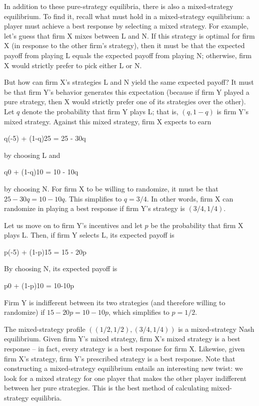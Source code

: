 In addition to these pure-strategy equilibria, there is also a mixed-strategy equilibrium. To find it, recall what must hold in a mixed-strategy equilibrium: a player must achieve a best response by selecting a mixed strategy. For example, let’s guess that firm X mixes between L and N. If this strategy is optimal for firm X (in response to the other firm’s strategy), then it must be that the expected payoff from playing L equals the expected payoff from playing N; otherwise, firm X would strictly prefer to pick either L or N.

But how can firm X’s strategies L and N yield the same expected payoff? It must be that firm Y’s behavior generates this expectation (because if firm Y played a pure strategy, then X would strictly prefer one of its strategies over the other). Let $q$ denote the probability that firm Y plays L; that is, $(q, 1 - q)$ is firm Y’s mixed strategy. Against this mixed strategy, firm X expects to earn

\bee
q(-5) + (1-q)25 = 25 - 30q
\eee

by choosing L and

\bee
q0 + (1-q)10 = 10 - 10q
\eee

by choosing N. For firm X to be willing to randomize, it must be that $25 - 30q = 10 - 10q$. This simplifies to $q = 3/4$. In other words, firm X can randomize in playing a best response if firm Y’s strategy is $(3/4, 1/4)$.

Let us move on to firm Y’s incentives and let $p$ be the probability that firm X plays L. Then, if firm Y selects L, its expected payoff is

\bee
p(-5) + (1-p)15 = 15 - 20p
\eee

By choosing N, its expected payoff is

\bee
p0 + (1-p)10 = 10-10p
\eee

Firm Y is indifferent between its two strategies (and therefore willing to randomize) if $15 - 20p = 10 - 10p$, which simplifies to $p = 1/2$.

The mixed-strategy profile $((1/2, 1/2), (3/4, 1/4))$ is a mixed-strategy Nash equilibrium. Given firm Y’s mixed strategy, firm X’s mixed strategy is a best response -- in fact, every strategy is a best response for firm X. Likewise, given firm X’s strategy, firm Y’s prescribed strategy is a best response. Note that constructing a mixed-strategy equilibrium entails an interesting new twist: we look for a mixed strategy for one player that makes the other player indifferent between her pure strategies. This is the best method of calculating mixed-strategy equilibria.


